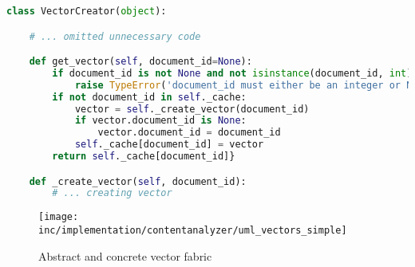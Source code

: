 \begin{lstlisting}[language=Python,caption={Dynamic programming},label={lst:dynamic-programming},float=h]
class VectorCreator(object):

    # ... omitted unnecessary code

    def get_vector(self, document_id=None):
        if document_id is not None and not isinstance(document_id, int):
            raise TypeError('document_id must either be an integer or None')
        if not document_id in self._cache:
            vector = self._create_vector(document_id)
            if vector.document_id is None:
                vector.document_id = document_id
            self._cache[document_id] = vector
        return self._cache[document_id]}

    def _create_vector(self, document_id):
        # ... creating vector
\end{lstlisting}


\begin{figure}[h]
    \center
    \texttt{[image: inc/implementation/contentanalyzer/uml\_vectors\_simple]}
    \caption{Abstract and concrete vector fabric}
    \label{fig:uml-vectorssimple}
\end{figure}
